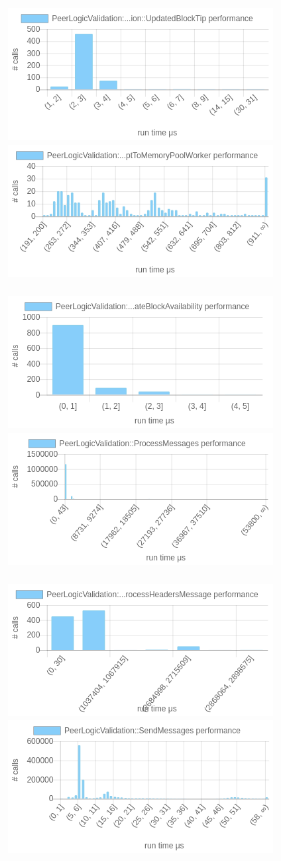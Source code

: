 \documentclass{article}
\begin{document}
\includegraphics[width=7cm]{images/london/chartPeerLogicValidation_3A_3AProcessMessages-_3EProcessMessage-_3EProcessMessage-_3EPeerLogicValidation_3A_3AUpdatedBlockTip.png}
\includegraphics[width=7cm]{images/london/chartPeerLogicValidation_3A_3AProcessMessages-_3EProcessMessage-_3EAcceptToMemoryPoolWithTime-_3EAcceptToMemoryPoolWorker.png}

\includegraphics[width=7cm]{images/london/chartPeerLogicValidation_3A_3AProcessMessages-_3EProcessMessage-_3EProcessHeadersMessage-_3EUpdateBlockAvailability.png}
\includegraphics[width=7cm]{images/london/chartPeerLogicValidation_3A_3AProcessMessages.png}

\includegraphics[width=7cm]{images/london/chartPeerLogicValidation_3A_3AProcessMessages-_3EProcessMessage-_3EProcessHeadersMessage.png}
\includegraphics[width=7cm]{images/london/chartPeerLogicValidation_3A_3ASendMessages.png}
\end{document}
